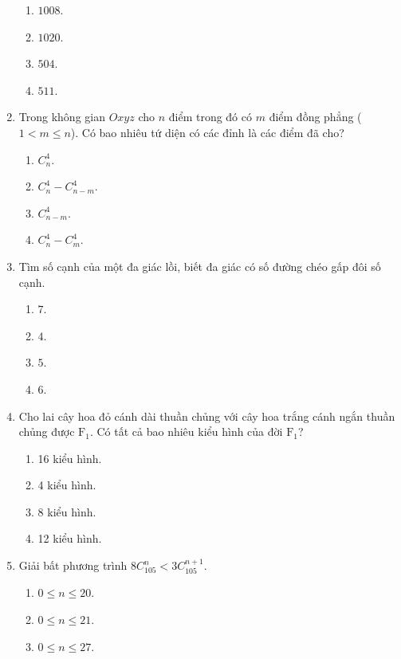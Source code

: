 \begin{enumerate}[label=\textbf{Câu \arabic*.},align=left,left=0cm..0cm,itemindent=*]
\begin{multicols}{4}
\begin{enumerate}[label=\textbf{\Alph*.},align=left,left=1cm..0cm,itemindent=*]
		\item $1008$. \item $1020$. \item $504$. \item $511$.
	\end{enumerate}\end{multicols}
	\item Trong không gian $Oxyz$ cho $n$ điểm trong đó có $m$ điểm đồng phẳng ($1<m\leqslant n$). Có bao nhiêu tứ diện có các đỉnh là các điểm đã cho?
	\begin{enumerate}[label=\textbf{\Alph*.},align=left,left=1cm..0cm,itemindent=*]
		\item $C_{n}^{4}$.
		\item $C_{n}^{4}-C_{n-m}^{4}$.
		\item $C_{n-m}^{4}$.
		\item $C_{n}^{4}-C_{m}^{4}$.
	\end{enumerate}
	\item Tìm số cạnh của một đa giác lồi, biết đa giác có số đường chéo gấp đôi số cạnh.
	\begin{multicols}{4}\begin{enumerate}[label=\textbf{\Alph*.},align=left,left=1cm..0cm,itemindent=*]
		\item $7$. \item $4$. \item $5$. \item $6$.
	\end{enumerate}\end{multicols}
	\item Cho lai cây hoa đỏ cánh dài thuần chủng với cây hoa trắng cánh ngắn thuần chủng được $\text{F}_1$. Có tất cả bao nhiêu kiểu hình của đời $\text{F}_1$?
	\begin{enumerate}[label=\textbf{\Alph*.},align=left,left=1cm..0cm,itemindent=*]
		\item 16 kiểu hình. \item 4 kiểu hình. \item 8 kiểu hình. \item 12 kiểu hình.
	\end{enumerate}
	\item Giải bất phương trình $8C_{105}^{n}<3C_{105}^{n+1}$.
	\begin{enumerate}[label=\textbf{\Alph*.},align=left,left=1cm..0cm,itemindent=*]
		\item $0\leqslant n\leqslant 20$.
		\item $0\leqslant n\leqslant 21$.
		\item $0\leqslant n\leqslant 27$.

\end{enumerate}
\end{enumerate}
